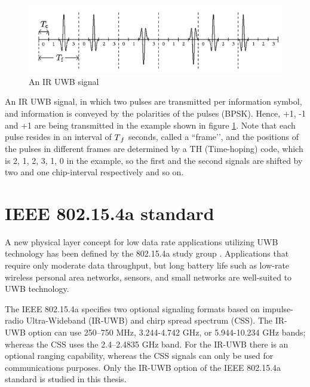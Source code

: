 \documentclass[\main/main.tex]{subfiles}
\begin{document}

\begin{figure}[H]
    \centering
    \includegraphics[width=1\textwidth]{an_ir_uwb_signal}
    \caption{An IR UWB signal}
    \label{fig:an_ir_uwb_signal}
\end{figure}

An IR UWB signal, in which two pulses are transmitted per information symbol, and information is conveyed by the polarities of the pulses (BPSK). Hence, +1, -1 and +1 are being transmitted in the example shown in figure \ref{fig:an_ir_uwb_signal}. Note that each pulse resides in an interval of $T\textsubscript{$f$}$ seconds, called a “frame’’, and the positions of the pulses in different frames are determined by a TH (Time-hoping) code, which is {2, 1, 2, 3, 1, 0} in the example, so the first and the second signals are shifted by two and one chip-interval respectively and so on. 

\section{IEEE 802.15.4a standard}
A new physical layer concept for low data rate applications utilizing UWB technology has been defined by the 802.15.4a study group \cite{IEEE_Std_802_15_4_2015}. Applications that require only moderate data throughput, but long battery life such as low-rate wireless personal area networks, sensors, and small networks are well-suited to UWB technology.

The IEEE 802.15.4a specifies two optional signaling formats based on  impulse-radio Ultra-Wideband (IR-UWB) and chirp spread spectrum (CSS). The IR-UWB option can use 250–750 MHz, 3.244-4.742 GHz, or 5.944-10.234 GHz bands; whereas the CSS uses the 2.4–2.4835 GHz band. For the IR-UWB there is an optional ranging capability, whereas the CSS signals can only be used for communications purposes. Only the IR-UWB option of the IEEE 802.15.4a standard is studied in this thesis.
\end{document}
